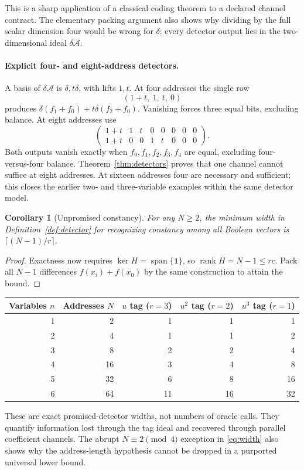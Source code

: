 \documentclass[11pt,a4paper]{article}
\newtheorem{corollary}[theorem]{Corollary}
\theoremstyle{definition}\newtheorem{definition}[theorem]{Definition}
\theoremstyle{remark}\newtheorem{remark}[theorem]{Remark}
\newcommand{\A}{\mathcal A}
\newcommand{\rank}{\operatorname{rank}}
\newcommand{\Span}{\operatorname{span}}
\numberwithin{equation}{section}
\begin{document}
This is a sharp application of a classical coding theorem to a declared channel contract. The elementary packing argument also shows why dividing by the full scalar dimension four would be wrong for $\delta$: every detector output lies in the two-dimensional ideal $\delta\A$.

\paragraph{Explicit four- and eight-address detectors.}
A basis of $\delta\A$ is $\delta,t\delta$, with lifts $1,t$. At four addresses the single row
\[
 (1+t,\ 1,\ t,\ 0)
\]
produces $\delta(f_1+f_0)+t\delta(f_2+f_0)$. Vanishing forces three equal bits, excluding balance. At eight addresses use
\[
 \begin{pmatrix}
 1+t&1&t&0&0&0&0&0\\
 1+t&0&0&1&t&0&0&0
 \end{pmatrix}.
\]
Both outputs vanish exactly when $f_0,f_1,f_2,f_3,f_4$ are equal, excluding four-versus-four balance. Theorem~\ref{thm:detectors} proves that one channel cannot suffice at eight addresses. At sixteen addresses four are necessary and sufficient; this closes the earlier two- and three-variable examples within the same detector model.

\begin{corollary}[Unpromised constancy]\label{cor:constancy}
For any $N\ge2$, the minimum width in Definition~\ref{def:detector} for recognizing constancy among all Boolean vectors is $\lceil(N-1)/r\rceil$.
\end{corollary}
\begin{proof}
Exactness now requires $\ker H=\Span\{\mathbf1\}$, so $\rank H=N-1\le rc$. Pack all $N-1$ differences $f(x_i)+f(x_0)$ by the same construction to attain the bound.
\end{proof}

\begin{center}\small
\begin{tabular}{@{}rrrrr@{}}\toprule
Variables $n$ & Addresses $N$ & $u$ tag ($r=3$) & $u^2$ tag ($r=2$) & $u^3$ tag ($r=1$)\\\midrule
1&2&1&1&1\\
2&4&1&1&2\\
3&8&2&2&4\\
4&16&3&4&8\\
5&32&6&8&16\\
6&64&11&16&32\\\bottomrule
\end{tabular}
\end{center}
These are exact promised-detector widths, not numbers of oracle calls. They quantify information lost through the tag ideal and recovered through parallel coefficient channels. The abrupt $N\equiv2\pmod4$ exception in \eqref{eq:width} also shows why the address-length hypothesis cannot be dropped in a purported universal lower bound.
\end{document}
